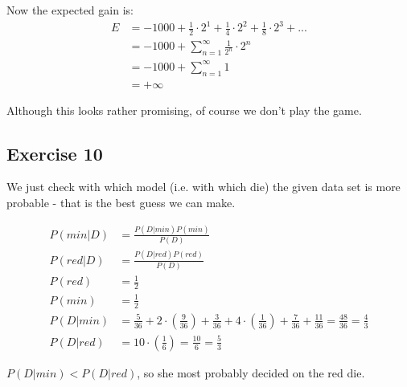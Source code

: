 Now the expected gain is:
\begin{align*}
E &= -1000 + \frac{1}{2} \cdot 2^1 + \frac{1}{4} \cdot 2^2 + \frac{1}{8} \cdot 2^3 + ... \\
  &= -1000 + \sum\limits_{n=1}^\infty \frac{1}{2^n} \cdot 2^n \\
  &= -1000 + \sum\limits_{n=1}^\infty 1 \\
  &= +\infty
\end{align*}

Although this looks rather promising, of course we don't play the game.

\subsection*{Exercise 10}
We just check with which model (i.e. with which die) the given data set is more probable - that is the best guess we can make.

\begin{align*}
P(min|D) &= \frac{P(D|min)P(min)}{P(D)} \\
P(red|D) &= \frac{P(D|red)P(red)}{P(D)} \\
P(red)   &= \frac{1}{2}  \\
P(min)   &= \frac{1}{2}  \\
P(D|min) &= \frac{5}{36} 
      + 2 \cdot \left(\frac{9}{36}\right)
      + \frac{3}{36}
      + 4 \cdot \left( \frac{1}{36} \right)
      + \frac{7}{36}
      + \frac{11}{36}
      = \frac{48}{36} = \frac{4}{3} \\
P(D|red) &= 10 \cdot \left(\frac{1}{6}\right) = \frac{10}{6} = \frac{5}{3}
\end{align*}

$P(D|min) < P(D|red)$, so she most probably decided on the red die.
